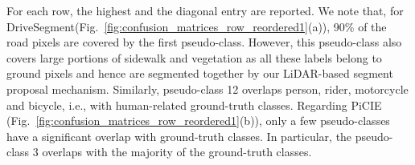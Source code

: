 \documentclass[runningheads]{llncs}
\newcommand{\ours}{DriveSegment\xspace}
\begin{document}
For each row, the highest and the diagonal entry are reported. We note that, for \ours (Fig.~\ref{fig:confusion_matrices_row_reordered1}(a)), 90\% of the road pixels are covered by the first pseudo-class. However, this pseudo-class also covers large portions of sidewalk and vegetation as all these labels belong to ground pixels and hence are segmented together by our LiDAR-based segment proposal mechanism. Similarly, pseudo-class 12 overlaps person, rider, motorcycle and bicycle, i.e., with human-related ground-truth classes. Regarding PiCIE (Fig.~\ref{fig:confusion_matrices_row_reordered1}(b)), only a few pseudo-classes 
have a significant overlap with ground-truth classes. In particular, the pseudo-class 3
overlaps with the majority of the ground-truth classes. 

\setlength{\fboxsep}{3mm} \renewcommand{\tabcolsep}{-2.pt}
\end{document}
